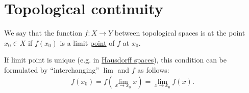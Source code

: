 \section{Topological continuity}\label{sec:topological_continuity}

\begin{definition}\label{def:local_continuity}
  We say that the function \( f: X \to Y \) between topological spaces is  at the point \( x_0 \in X \) if \( f(x_0) \) is a limit \hyperref[def:local_convergence]{point} of \( f \) at \( x_0 \).

  If limit point is unique (e.g. in \hyperref[def:separation_axioms/T2]{Hausdorff spaces}), this condition can be formulated by \enquote{interchanging} \( \lim \) and \( f \) as follows:
  \begin{equation*}
    f(x_0) = f\left( \lim_{x \to x_0} x \right) = \lim_{x \to x_0} f(x).
  \end{equation*}
\end{definition}

